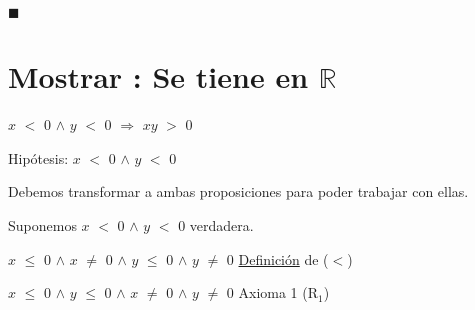 \documentclass[12pt]{article}
\renewcommand{\qedsymbol}{$\blacksquare$}
\begin{document}
\hspace{7cm} {\textcolor{carrotorange}{\qedsymbol}}


\newpage

\section{\textsf{Mostrar {} {}: Se tiene en $\mathbb{R}$ }} \vspace{.5cm}

{\LARGE{{} \hspace{.1cm} $x$ $<$ $0$ $\wedge$ $y$ $<$ $0$ $\Longrightarrow$ $xy$ $>$ $0$}} \vspace{.5cm}


{}  \vspace{0.5cm}

{} \vspace{0.5cm} 

{\textcolor{palatinateblue}{Hipótesis:} {\Large{$x$ $<$ $0$ $\wedge$ $y$ $<$ $0$}}} \vspace{0.5cm}

{\textcolor{palatinateblue}{Debemos transformar a ambas proposiciones para poder trabajar con ellas.}} \vspace{0.5cm}

{\textcolor{palatinateblue}{Suponemos}} {\Large{$x$ $<$ $0$ $\wedge$ $y$ $<$ $0$ }} {\textcolor{pakistangreen}{verdadera.}} \vspace{0.5cm}

$x$ $\leq$ $0$ \hspace{0.2cm} $\wedge$ \hspace{0.2cm} $x$ $\neq$ $0$ \hspace{0.2cm} $\wedge$ \hspace{0.2cm} $y$ $\leq$ $0$ \hspace{0.2cm} $\wedge$ \hspace{0.2cm} $y$ $\neq$ $0$ \hspace{2cm} {\textcolor{carrotorange}{{\underline{Definición} de ($<$)}}} \vspace{0.5cm}

$x$ $\leq$ $0$ \hspace{0.2cm} $\wedge$ \hspace{0.2cm} $y$ $\leq$ $0$ \hspace{0.2cm} $\wedge$ \hspace{0.2cm} $x$ $\neq$ $0$  \hspace{0.2cm} $\wedge$ \hspace{0.2cm} $y$ $\neq$ $0$ \hspace{2cm} {\textcolor{carrotorange}{Axioma 1 (R$_{1}$)}} \vspace{0.5cm}
 
\end{document}
